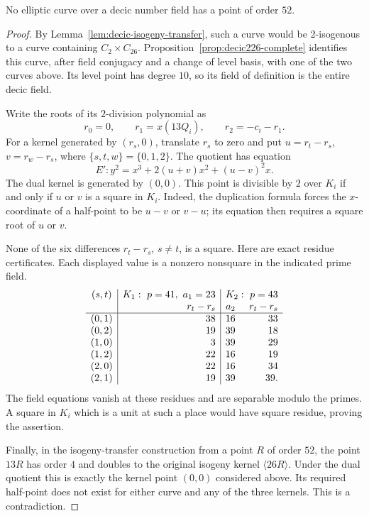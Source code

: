 \begin{proposition}\label{prop:decic52}
No elliptic curve over a decic number field has a point of order $52$.
\end{proposition}
\begin{proof}
By Lemma~\ref{lem:decic-isogeny-transfer}, such a curve would be
$2$-isogenous to a curve containing $C_2\times C_{26}$.
Proposition~\ref{prop:decic226-complete} identifies this curve, after
field conjugacy and a change of level basis, with one of the two
curves above. Its level point has degree $10$, so its field of
definition is the entire decic field.

Write the roots of its $2$-division polynomial as
\[
 r_0=0,\qquad r_1=x(13Q_i),\qquad r_2=-c_i-r_1.
\]
For a kernel generated by $(r_s,0)$, translate $r_s$ to zero and put
$u=r_t-r_s$, $v=r_w-r_s$, where $\{s,t,w\}=\{0,1,2\}$.
The quotient has equation
\[
 E':y^2=x^3+2(u+v)x^2+(u-v)^2x.
\]
The dual kernel is generated by $(0,0)$.
This point is divisible by $2$ over $K_i$ if and only if $u$ or $v$
is a square in $K_i$. Indeed, the duplication formula forces the
$x$-coordinate of a half-point to be $u-v$ or $v-u$; its equation
then requires a square root of $u$ or $v$.

None of the six differences $r_t-r_s$, $s\ne t$, is a square.
Here are exact residue certificates. Each displayed value is a
nonzero nonsquare in the indicated prime field.
\[
\begin{array}{c|r|rr}
 (s,t)&K_1:\ p=41,\ a_1=23
       &\multicolumn{2}{c}{K_2:\ p=43}\\
 &r_t-r_s&a_2&r_t-r_s\\\hline
 (0,1)&38&16&33\\
 (0,2)&19&39&18\\
 (1,0)&3&39&29\\
 (1,2)&22&16&19\\
 (2,0)&22&16&34\\
 (2,1)&19&39&39.
\end{array}
\]
The field equations vanish at these residues and are separable
modulo the primes. A square in $K_i$ which is a unit at such a place
would have square residue, proving the assertion.

Finally, in the isogeny-transfer construction from a point $R$ of
order $52$, the point $13R$ has order $4$ and doubles to the original
isogeny kernel $\langle26R\rangle$. Under the dual quotient this is
exactly the kernel point $(0,0)$ considered above. Its required
half-point does not exist for either curve and any of the three
kernels. This is a contradiction.
\end{proof}
